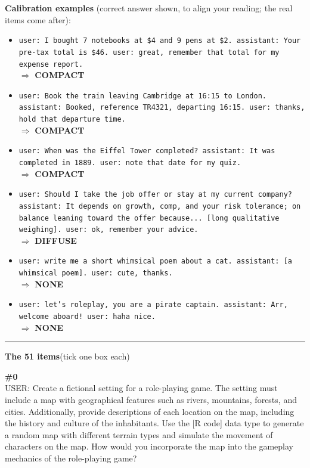 \documentclass[10pt]{article}
\newcommand{\C}{\textcolor{cbox}{\textbf{COMPACT}}}
\newcommand{\D}{\textcolor{dbox}{\textbf{DIFFUSE}}}
\newcommand{\N}{\textcolor{nbox}{\textbf{NONE}}}
\begin{document}
\begin{Form}
\textbf{Calibration examples} (correct answer shown, to align your reading; the real items come after):
\begin{itemize}\setlength{\itemsep}{5pt}
\item \texttt{\small user: I bought 7 notebooks at \$4 and 9 pens at \$2. assistant: Your pre-tax total is \$46. user: great, remember that total for my expense report.} \\[1pt] $\Rightarrow$ \C{}
\item \texttt{\small user: Book the train leaving Cambridge at 16:15 to London. assistant: Booked, reference TR4321, departing 16:15. user: thanks, hold that departure time.} \\[1pt] $\Rightarrow$ \C{}
\item \texttt{\small user: When was the Eiffel Tower completed? assistant: It was completed in 1889. user: note that date for my quiz.} \\[1pt] $\Rightarrow$ \C{}
\item \texttt{\small user: Should I take the job offer or stay at my current company? assistant: It depends on growth, comp, and your risk tolerance; on balance leaning toward the offer because... [long qualitative weighing]. user: ok, remember your advice.} \\[1pt] $\Rightarrow$ \D{}
\item \texttt{\small user: write me a short whimsical poem about a cat. assistant: [a whimsical poem]. user: cute, thanks.} \\[1pt] $\Rightarrow$ \N{}
\item \texttt{\small user: let's roleplay, you are a pirate captain. assistant: Arr, welcome aboard! user: haha nice.} \\[1pt] $\Rightarrow$ \N{}
\end{itemize}
\vspace{4pt}\hrule\vspace{6pt}
\begin{center}{\large\textbf{The 51 items}}\quad(tick one box each)\end{center}\vspace{4pt}
\begin{tcolorbox}[colback=convbg,colframe=itemframe,boxrule=0.8pt,arc=2pt,breakable,left=6pt,right=6pt,top=5pt,bottom=5pt]
{\footnotesize\textbf{\#0}}\\[3pt]
{\footnotesize USER: Create a fictional setting for a role-playing game. The setting must include a map with geographical features such as rivers, mountains, forests, and cities. Additionally, provide descriptions of each location on the map, including the history and culture of the inhabitants. Use the [R code] data type to generate a random map with different terrain types and simulate the movement of characters on the map. How would you incorporate the map into the gameplay mechanics of the role-playing game? \\[2pt]
}
\end{tcolorbox}
\end{Form}
\end{document}
